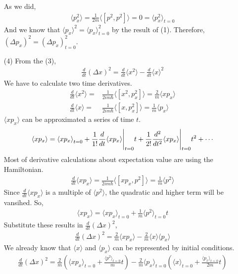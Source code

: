 \documentclass[aps,floatfix,nofootinbib,superscriptaddress,fleqn]{revtex4}
\begin{document}
\begin{itemize}
As we did, 
\begin{align}
  \langle p_x^2\rangle = \frac{1}{2m}\langle \left[p^2,p^2\right] \rangle = 0 = \langle p_x^2\rangle_{t=0}
\end{align}
And we know that $\langle p_x\rangle^2 = \langle p_x\rangle^2_{t=0}$ by the result of (1).
Therefore, ${(\Delta p_x)}^2  = {(\Delta p_x)}^2_{t=0}$.
\item[(4)] From the (3),
  \begin{align}
          \frac{d}{dt}{(\Delta x)}^2 = \frac{d}{dt}\langle x^2\rangle - \frac{d}{dt}\langle x\rangle^2
  \end{align}
  We have to calculate two time derivatives.
  \begin{align}
    \frac{d}{dt}\langle x^2\rangle=&\frac{1}{2im\hbar}\langle\left[x^2,p^2_x\right]\rangle=\frac{2}{m}\langle xp_x \rangle \\
    \frac{d}{dt}\langle x\rangle=&\frac{1}{2im\hbar}\langle\left[x,p^2_x\right]\rangle=\frac{1}{m}\langle p_x\rangle
  \end{align}
  $\langle xp_x \rangle$ can be approximated a series of time $t$.
  \begin{align}
    \langle xp_x \rangle = {\langle xp_x \rangle}_{t=0} + \frac{1}{1!}\frac{d}{dt}\langle xp_x \rangle \Bigg{|}_{t=0}t 
    + \frac{1}{2!}\frac{d^2}{dt^2}\langle xp_x \rangle \Bigg{|}_{t=0}t^2+\cdots
  \end{align}
  Most of derivative calculations about expectation value are using the Hamiltonian.
  \begin{align}
    \frac{d}{dt}\langle xp_x \rangle = \frac{1}{2im\hbar}\langle \left[ xp_x,p^2 \right] \rangle= \frac{1}{m}\langle p^2 \rangle
  \end{align} 
  Since $\frac{d}{dt}\langle xp_x \rangle$ is a multiple of $\langle p^2 \rangle$, the quadratic and higher term will be vansihed. So,
  \begin{align}
    \langle xp_x \rangle=\langle xp_x \rangle_{t=0}+\frac{1}{m}\langle p^2 \rangle_{t=0}t
  \end{align}
    Substitute these results in $\frac{d}{dt}{(\Delta x)}^2$,
\begin{align}
  \frac{d}{dt}{(\Delta x)}^2=\frac{2}{m}\langle xp_x \rangle- \frac{2}{m}\langle x\rangle\langle p_x\rangle
\end{align}
We already know that $\langle x \rangle$ and $\langle p_x \rangle$ can be represented by initial conditions.
 \begin{align}
  \frac{d}{dt}{(\Delta x)}^2 = \frac{2}{m}\left(\langle xp_x \rangle_{t=0}+\frac{\langle p^2 \rangle_{t=0}}{m}t\right) 
  - \frac{2}{m}\langle p_x\rangle_{t=0}\left(\langle x\rangle_{t=0}+\frac{\langle p_x \rangle_{t=0}}{2m}t\right)
 \end{align}
\end{itemize}
\end{document}

